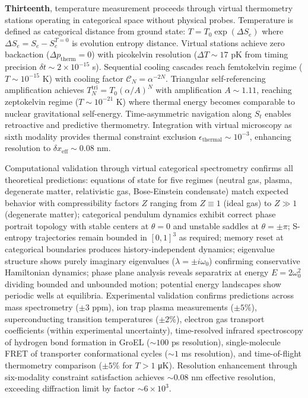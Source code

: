 \documentclass[12pt,a4paper]{article}
\theoremstyle{plain}
\theoremstyle{definition}
\theoremstyle{remark}
\newcommand{\St}{S_t}
\newcommand{\Se}{S_e}
\begin{document}
\textbf{Thirteenth}, temperature measurement proceeds through virtual thermometry stations operating in categorical space without physical probes. Temperature is defined as categorical distance from ground state: $T = T_0 \exp(\Delta \Se)$ where $\Delta \Se = \Se - \Se^{T=0}$ is evolution entropy distance. Virtual stations achieve zero backaction ($\Delta p_{\text{therm}} = 0$) with picokelvin resolution ($\Delta T \sim 17$ pK from timing precision $\delta t \sim 2 \times 10^{-15}$ s). Sequential cooling cascades reach femtokelvin regime ($T \sim 10^{-15}$ K) with cooling factor $\mathcal{C}_N = \alpha^{-2N}$. Triangular self-referencing amplification achieves $T_N^{\text{tri}} = T_0 (\alpha/A)^N$ with amplification $A \sim 1.11$, reaching zeptokelvin regime ($T \sim 10^{-21}$ K) where thermal energy becomes comparable to nuclear gravitational self-energy. Time-asymmetric navigation along $\St$ enables retroactive and predictive thermometry. Integration with virtual microscopy as sixth modality provides thermal constraint exclusion $\epsilon_{\text{thermal}} \sim 10^{-3}$, enhancing resolution to $\delta x_{\text{eff}} \sim 0.08$ nm.

Computational validation through virtual categorical spectrometry confirms all theoretical predictions: equations of state for five regimes (neutral gas, plasma, degenerate matter, relativistic gas, Bose-Einstein condensate) match expected behavior with compressibility factors $Z$ ranging from $Z \equiv 1$ (ideal gas) to $Z \gg 1$ (degenerate matter); categorical pendulum dynamics exhibit correct phase portrait topology with stable centers at $\theta = 0$ and unstable saddles at $\theta = \pm\pi$; S-entropy trajectories remain bounded in $[0,1]^3$ as required; memory reset at categorical boundaries produces history-independent dynamics; eigenvalue structure shows purely imaginary eigenvalues ($\lambda = \pm i\omega_0$) confirming conservative Hamiltonian dynamics; phase plane analysis reveals separatrix at energy $E = 2\omega_0^2$ dividing bounded and unbounded motion; potential energy landscapes show periodic wells at equilibria. Experimental validation confirms predictions across mass spectrometry ($\pm 3$ ppm), ion trap plasma measurements ($\pm 5\%$), superconducting transition temperatures ($\pm 2\%$), electron gas transport coefficients (within experimental uncertainty), time-resolved infrared spectroscopy of hydrogen bond formation in GroEL ($\sim 100$ ps resolution), single-molecule FRET of transporter conformational cycles ($\sim 1$ ms resolution), and time-of-flight thermometry comparison ($\pm 5\%$ for $T > 1$ μK). Resolution enhancement through six-modality constraint satisfaction achieves $\sim 0.08$ nm effective resolution, exceeding diffraction limit by factor $\sim 6 \times 10^3$.
\end{document}

